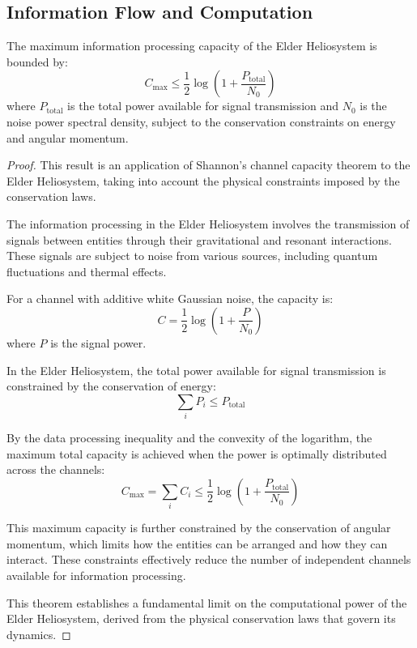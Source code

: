 \subsection{Information Flow and Computation}

\begin{theorem}
The maximum information processing capacity of the Elder Heliosystem is bounded by:
\begin{equation}
C_{\text{max}} \leq \frac{1}{2} \log\left(1 + \frac{P_{\text{total}}}{N_0}\right)
\end{equation}
where $P_{\text{total}}$ is the total power available for signal transmission and $N_0$ is the noise power spectral density, subject to the conservation constraints on energy and angular momentum.
\end{theorem}

\begin{proof}
This result is an application of Shannon's channel capacity theorem to the Elder Heliosystem, taking into account the physical constraints imposed by the conservation laws.

The information processing in the Elder Heliosystem involves the transmission of signals between entities through their gravitational and resonant interactions. These signals are subject to noise from various sources, including quantum fluctuations and thermal effects.

For a channel with additive white Gaussian noise, the capacity is:
\begin{equation}
C = \frac{1}{2} \log\left(1 + \frac{P}{N_0}\right)
\end{equation}
where $P$ is the signal power.

In the Elder Heliosystem, the total power available for signal transmission is constrained by the conservation of energy:
\begin{equation}
\sum_i P_i \leq P_{\text{total}}
\end{equation}

By the data processing inequality and the convexity of the logarithm, the maximum total capacity is achieved when the power is optimally distributed across the channels:
\begin{equation}
C_{\text{max}} = \sum_i C_i \leq \frac{1}{2} \log\left(1 + \frac{P_{\text{total}}}{N_0}\right)
\end{equation}

This maximum capacity is further constrained by the conservation of angular momentum, which limits how the entities can be arranged and how they can interact. These constraints effectively reduce the number of independent channels available for information processing.

This theorem establishes a fundamental limit on the computational power of the Elder Heliosystem, derived from the physical conservation laws that govern its dynamics.
\end{proof}

